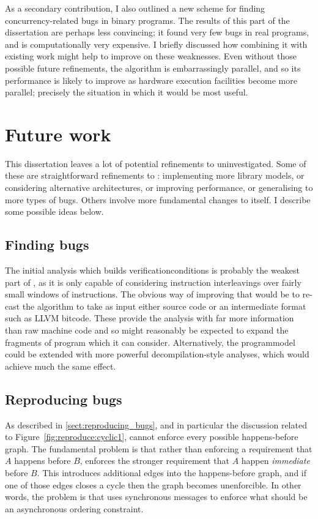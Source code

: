 As a secondary contribution, I also outlined a new scheme for finding
concurrency-related bugs in binary programs.  The results of this part
of the dissertation are perhaps less convincing; it found very few
bugs in real programs, and is computationally very expensive.  I
briefly discussed how combining it with existing work might help to
improve on these weaknesses.  Even without those possible future
refinements, the algorithm is embarrassingly parallel, and so its
performance is likely to improve as hardware execution facilities
become more parallel; precisely the situation in which it would be
most useful.

\section{Future work}

This dissertation leaves a lot of potential refinements to
{\technique} uninvestigated.  Some of these are straightforward
refinements to {\implementation}: implementing more {\StateMachine}
library models, or considering alternative architectures, or improving
performance, or generalising to more types of bugs.  Others involve
more fundamental changes to {\technique} itself.  I describe some
possible ideas below.

\subsection{Finding bugs}

The initial analysis which builds \glspl{verificationcondition} is
probably the weakest part of {\technique}, as it is only capable of
considering instruction interleavings over fairly small windows of
instructions.  The obvious way of improving that would be to re-cast
the algorithm to take as input either source code or an intermediate
format such as LLVM bitcode\needCite{}.  These provide the analysis
with far more information than raw machine code and so might
reasonably be expected to expand the fragments of program which it can
consider.  Alternatively, the \gls{programmodel} could be extended
with more powerful decompilation-style analyses, which would achieve
much the same effect.

\subsection{Reproducing bugs}

As described in \autoref{sect:reproducing_bugs}, and in particular the
discussion related to Figure~\ref{fig:reproduce:cyclic1}, {\technique}
cannot enforce every possible happens-before graph.  The fundamental
problem is that rather than enforcing a requirement that $A$ happens
before $B$, {\technique} enforces the stronger requirement that $A$
happen \emph{immediate} before $B$.  This introduces additional edges
into the happens-before graph, and if one of those edges closes a
cycle then the graph becomes unenforcible.  In other words, the
problem is that {\technique} uses synchronous messages to enforce what
should be an asynchronous ordering constraint.

